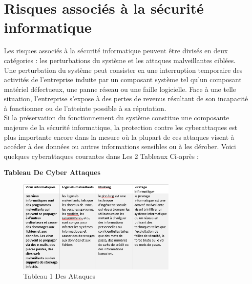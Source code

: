  \section{Risques associés à la sécurité informatique}
 Les risques associés à la sécurité informatique peuvent être divisés en deux catégories : les perturbations du système et les attaques malveillantes ciblées.\\
 
 Une perturbation du système peut consister en une interruption temporaire des activités de l’entreprise induite par un composant système tel qu’un composant matériel défectueux, une panne réseau ou une faille logicielle. Face à une telle situation, l’entreprise s’expose à des pertes de revenus résultant de son incapacité à fonctionner ou de l’atteinte possible à sa réputation.\\
 
 Si la préservation du fonctionnement du système constitue une composante majeure de la sécurité informatique, la protection contre les cyberattaques est plus importante encore dans la mesure où la plupart de ces attaques visent à accéder à des données ou autres informations sensibles ou à les dérober. Voici quelques cyberattaques courantes dans Les 2 Tableaux Ci-après :
 
 
  \centering \textbf{Tableau De Cyber Attaques}
 
 	\begin{figure}[h]
 		\begin{center}
 		\includegraphics[width=0.7\textwidth]{PhotoMemoire/tableau1_attaques.png}
 		\caption{Tableau 1  Des Attaques}
 		  \end{center}
 	\end{figure}
 

 \vspace{2 cm}
 
